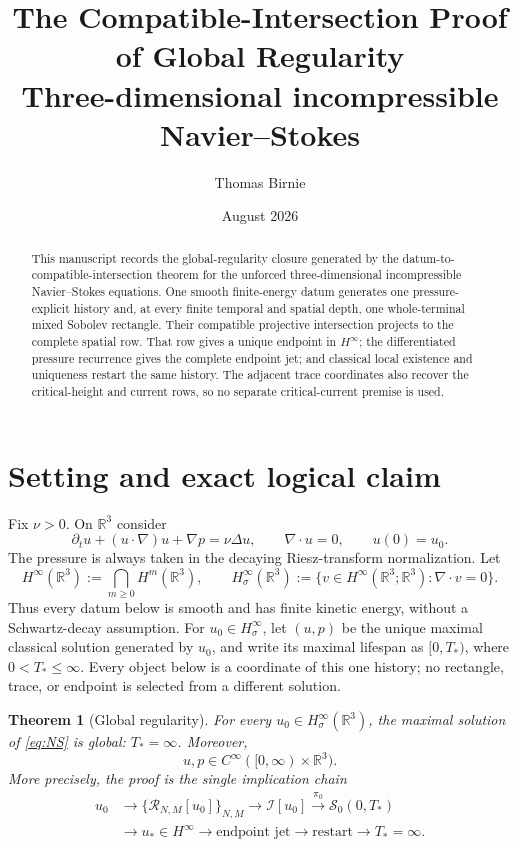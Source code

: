 \documentclass[11pt]{article}
\title{The Compatible-Intersection Proof of Global Regularity\\
\large Three-dimensional incompressible Navier--Stokes}
\author{Thomas Birnie}
\date{August 2026}
\newtheorem{theorem}{Theorem}[section]
\theoremstyle{definition}
\theoremstyle{remark}
\newcommand{\R}{\mathbb R}
\newcommand{\cI}{\mathcal I}
\newcommand{\cR}{\mathcal R}
\newcommand{\Szero}{\mathscr S_0}
\newcommand{\Hs}{H^\infty}
\begin{document}
\maketitle

\begin{abstract}
This manuscript records the global-regularity closure generated by the
datum-to-compatible-intersection theorem for the unforced three-dimensional
incompressible Navier--Stokes equations. One smooth finite-energy datum
generates one pressure-explicit history and, at every finite temporal and
spatial depth, one whole-terminal mixed Sobolev rectangle. Their compatible
projective intersection projects to the complete spatial row. That row gives
a unique endpoint in \(H^\infty\); the differentiated pressure recurrence gives
the complete endpoint jet; and classical local existence and uniqueness
restart the same history. The adjacent trace coordinates also recover the
critical-height and current rows, so no separate critical-current premise is
used.
\end{abstract}

\section{Setting and exact logical claim}

Fix \(\nu>0\). On \(\R^3\) consider
\begin{equation}
  \partial_tu+(u\cdot\nabla)u+\nabla p=\nu\Delta u,
  \qquad \nabla\cdot u=0,
  \qquad u(0)=u_0 .
  \label{eq:NS}
\end{equation}
The pressure is always taken in the decaying Riesz-transform normalization.
Let
\[
  \Hs(\R^3):=\bigcap_{m\geq0}H^m(\R^3),
  \qquad
  \Hs_\sigma(\R^3)
  :=\{v\in\Hs(\R^3;\R^3):\nabla\cdot v=0\}.
\]
Thus every datum below is smooth and has finite kinetic energy, without a
Schwartz-decay assumption.  For \(u_0\in\Hs_\sigma\), let \((u,p)\) be the unique maximal
classical solution generated by \(u_0\), and write its maximal lifespan as
\([0,T_*)\), where \(0<T_*\leq\infty\). Every object below is a coordinate of
this one history; no rectangle, trace, or endpoint is selected from a
different solution.

\begin{theorem}[Global regularity]
\label{thm:main}
For every \(u_0\in\Hs_\sigma(\R^3)\), the maximal solution of
\eqref{eq:NS} is global: \(T_*=\infty\). Moreover,
\[
  u,p\in C^\infty([0,\infty)\times\R^3).
\]
More precisely, the proof is the single implication chain
\begin{equation}
\begin{aligned}
u_0
&\longrightarrow
\{\cR_{N,M}[u_0]\}_{N,M}
\longrightarrow
\cI[u_0]
\xrightarrow{\pi_0}
\Szero(0,T_*)\\
&\longrightarrow
u_*\in\Hs
\longrightarrow
\text{endpoint jet}
\longrightarrow
\text{restart}
\longrightarrow
T_*=\infty.
\end{aligned}
\label{eq:chain}
\end{equation}
\end{theorem}
\end{document}
